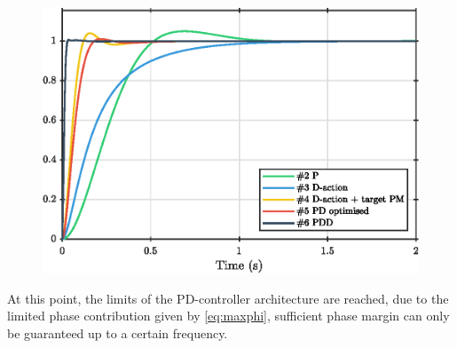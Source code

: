 \begin{figure}
    \centering
    \includegraphics[]{media/q1/pd_controllers_step.eps}
    \caption{}
    \label{fig:cont_controllers_step}
\end{figure}
At this point, the limits of the PD-controller architecture are reached, due to the limited phase contribution given by \cref{eq:maxphi}, sufficient phase margin can only be guaranteed up to a certain frequency. 

